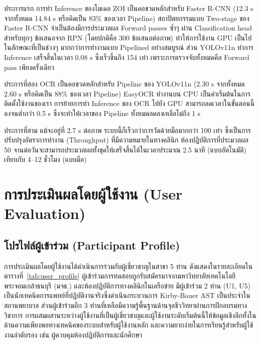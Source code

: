 ประการแรก การทำ Inference ของโมเดล ZOI เป็นคอขวดหลักสำหรับ Faster R-CNN (12.3 s จากทั้งหมด 14.84 s หรือคิดเป็น 83\% ของเวลา Pipeline) สถาปัตยกรรมแบบ Two-stage ของ Faster R-CNN จำเป็นต้องมีการประมวลผล Forward passes ซ้ำๆ ผ่าน Classification head สำหรับทุกๆ ข้อเสนอจาก RPN (โดยปกติคือ 300 ข้อเสนอต่อภาพ) ทำให้การใช้งาน GPU เป็นไปในลักษณะที่เป็นช่วงๆ มากกว่าการทำงานแบบ Pipelined อย่างสมบูรณ์ ส่วน YOLOv11n ทำการ Inference เสร็จสิ้นในเวลา 0.08 s ซึ่งเร็วขึ้นถึง 154 เท่า เพราะการตรวจจับทั้งหมดคือ Forward pass เพียงครั้งเดียว

ประการที่สอง OCR เป็นคอขวดหลักสำหรับ Pipeline ของ YOLOv11n (2.30 s จากทั้งหมด 2.60 s หรือคิดเป็น 88\% ของเวลา Pipeline) EasyOCR ทำงานบน CPU เป็นค่าเริ่มต้นในการติดตั้งใช้งานของเรา การย้ายการทำ Inference ของ OCR ไปยัง GPU สามารถลดเวลาในขั้นตอนนี้ลงจนต่ำกว่า 0.5 s ซึ่งจะทำให้เวลาของ Pipeline ทั้งหมดลดลงเหลือไม่ถึง 1 s

ประการที่สาม แม้จะอยู่ที่ 2.7 s ต่อภาพ ระบบนี้ก็เร็วกว่าการวัดด้วยมือมากกว่า 100 เท่า ซึ่งเป็นการปรับปรุงอัตราการทำงาน (Throughput) ที่มีความหมายในทางคลินิก ห้องปฏิบัติการที่ประมวลผล 50 จานต่อวันจะสามารถประมวลผลทั้งชุดให้เสร็จสิ้นได้ในเวลาประมาณ 2.5 นาที (แบบอัตโนมัติ) เทียบกับ 4--12 ชั่วโมง (แบบมือ)

\section{การประเมินผลโดยผู้ใช้งาน (User Evaluation)}
\label{sec:user_evaluation}

\subsection{โปรไฟล์ผู้เข้าร่วม (Participant Profile)}

การประเมินผลโดยผู้ใช้งานได้ดำเนินการร่วมกับผู้เชี่ยวชาญในสาขา 5 ท่าน ดังแสดงในรายละเอียดในตารางที่~\ref{tab:user_profile} ผู้เข้าร่วมการทดสอบถูกรับสมัครมาจากมหาวิทยาลัยเทคโนโลยีพระจอมเกล้าธนบุรี (มจธ.) และห้องปฏิบัติการทางคลินิกในเครือข่าย มีผู้เข้าร่วม 2 ท่าน (U1, U5) เป็นนักเทคนิคการแพทย์ที่ปฏิบัติงานจริงซึ่งดำเนินกระบวนการ Kirby-Bauer AST เป็นประจำในสถานพยาบาล ส่วนผู้เข้าร่วมอีก 3 ท่านที่เหลือมีความรู้พื้นฐานด้านจุลชีววิทยาผ่านการฝึกอบรมทางวิชาการ การผสมผสานระหว่างผู้ใช้งานที่เป็นผู้เชี่ยวชาญและผู้ใช้งานระดับเริ่มต้นนี้ให้ข้อมูลเชิงลึกทั้งในด้านความเพียงพอทางเทคนิคของระบบสำหรับผู้ใช้งานหลัก และความยากง่ายในการเรียนรู้สำหรับผู้ใช้งานลำดับรอง เช่น ผู้ควบคุมห้องปฏิบัติการและนักศึกษา

